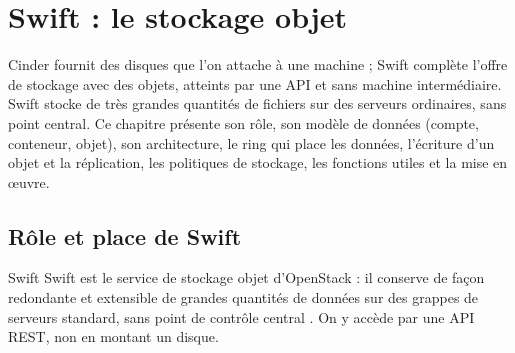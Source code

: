 
\section{Swift : le stockage objet}\label{chap:swift}

Cinder fournit des disques que l'on attache à une machine ; Swift complète l'offre de stockage avec des objets, atteints par une
API et sans machine intermédiaire. Swift stocke de très grandes quantités de fichiers sur des serveurs ordinaires, sans point
central. Ce chapitre présente son rôle, son modèle de données (compte, conteneur, objet), son architecture, le ring qui place
les données, l'écriture d'un objet et la réplication, les politiques de stockage, les fonctions utiles et la mise en œuvre.

\subsection{Rôle et place de Swift}\label{sec:sw-role}

\begin{definition}{Swift}
Swift est le service de stockage objet d'OpenStack : il conserve de façon redondante et extensible de grandes quantités de
données sur des grappes de serveurs standard, sans point de contrôle central \parencite{swift-intro}. On y accède par une
API REST, non en montant un disque.
\end{definition}

